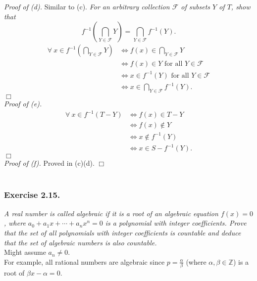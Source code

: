 \documentclass{article}
\begin{document}
\emph{Proof of (d).}
Similar to (c).
\emph{For an arbitrary collection $\mathscr{F}$ of subsets $Y$ of $T$,
show that
$$f^{-1}\left( \bigcap_{Y \in \mathscr{F}} Y \right)
= \bigcap_{Y \in \mathscr{F}} f^{-1}(Y).$$}
\begin{align*}
  \forall \: x \in f^{-1}\left( \bigcap_{Y \in \mathscr{F}} Y \right)
  &\Longleftrightarrow
  f(x) \in \bigcap_{Y \in \mathscr{F}} Y \\
  &\Longleftrightarrow
  f(x) \in Y \text{ for all } Y \in \mathscr{F} \\
  &\Longleftrightarrow
  x \in f^{-1}(Y) \text{ for all } Y \in \mathscr{F} \\
  &\Longleftrightarrow
  x \in \bigcap_{Y \in \mathscr{F}} f^{-1}(Y).
\end{align*}
$\Box$ \\

\emph{Proof of (e).}
\begin{align*}
  \forall \: x \in f^{-1}(T - Y)
  &\Longleftrightarrow
  f(x) \in T - Y \\
  &\Longleftrightarrow
  f(x) \not\in Y \\
  &\Longleftrightarrow
  x \not\in f^{-1}(Y) \\
  &\Longleftrightarrow
  x \in S - f^{-1}(Y).
\end{align*}
$\Box$ \\

\emph{Proof of (f).}
Proved in (c)(d).
$\Box$ \\\\






\subsubsection*{Exercise 2.15.}
\emph{A real number is called algebraic
if it is a root of an algebraic equation $f(x) = 0$,
where $a_0 + a_1 x + \cdots + a_n x^n = 0$ is a polynomial with integer coefficients.
Prove that the set of all polynomials with integer coefficients is countable
and deduce that the set of algebraic numbers is also countable.} \\

Might assume $a_n \neq 0$. \\

For example, all rational numbers are algebraic
since $p = \frac{\alpha}{\beta}$ (where $\alpha, \beta \in \mathbb{Z}$)
is a root of $\beta x - \alpha = 0$. \\
\end{document}

